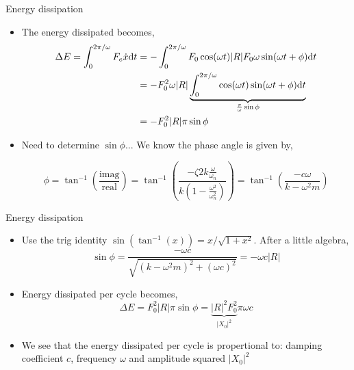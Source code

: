 \documentclass[11pt,aspectratio=169,handout]{beamer}
\begin{document}
\begin{frame}[c]{Energy dissipation}
	\begin{itemize}
		\item<1-> The energy dissipated becomes,
		\begin{align}
			\Delta E = \int_0^{2\pi/\omega} F_e\dot{x} {\rm d}t &=  -\int_0^{2\pi/\omega}  F_0 \cos(\omega t)|R| F_0\omega \sin(\omega t +\phi) {\rm d}t\\
			&=  -F_0^2 \omega |R| \underbrace{\int_0^{2\pi/\omega}   \cos(\omega t) \sin(\omega t + \phi) {\rm d}t}_{\frac{\pi}{\omega} \sin \phi}\\
				&= - F_0^2  |R| \pi \sin \phi
		\end{align}
		\item<2-> Need to determine $\sin\phi$... We know the phase angle is given by,

	
	\begin{equation}
		\phi = \tan^{-1}\left( \frac{\mbox{imag}}{\mbox{real}} \right) = \tan^{-1}\left( \frac{-\zeta 2 k \frac{\omega}{\omega_n} }{k\left(1 - \frac{\omega^2}{\omega_n^2}\right)} \right) =\tan^{-1}\left( \frac{-c \omega }{k - \omega^2 m} \right) 
	\end{equation}
	\end{itemize}
\end{frame}

\begin{frame}[c]{Energy dissipation}
	\begin{itemize}
		\item<1-> Use the trig identity $\sin(\tan^{-1}(x)) = x/\sqrt{1+x^2}$. After a little algebra,
		\begin{equation}
			\sin\phi = \frac{-\omega c}{\sqrt{(k-\omega^2m)^2 + (\omega c)^2}} = -\omega c |R|
		\end{equation} 
		\item<2-> Energy dissipated per cycle becomes, 
		\begin{equation}
			\Delta E = F_0^2  |R| \pi \sin \phi = \underbrace{|R|^2  F_0^2}_{|X_0|^2} \pi \omega c 
		\end{equation}
	\item<3-> We see that the energy dissipated per cycle is propertional to: damping coefficient $c$, frequency $\omega$ and amplitude squared $|X_0|^2$
	\end{itemize}
\end{frame}
\end{document}
